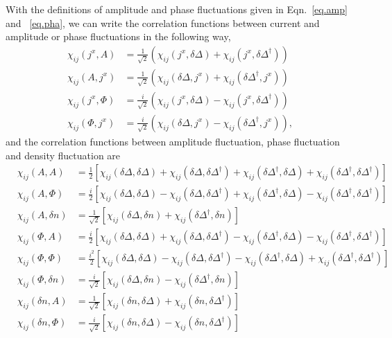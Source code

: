 \documentclass[Colective.tex]{revtex4-1}
\begin{document}
With the definitions of amplitude and phase fluctuations given in Eqn.~\eqref{eq.amp} and ~\eqref{eq.pha}, we can write the correlation functions between current and amplitude or phase fluctuations in the following way,
\begin{eqnarray}
\chi_{ij}(j^x,A) &=\frac{1}{\sqrt{2}} \left( \chi_{ij}(j^x,\delta\Delta) + \chi_{ij}(j^x,\delta\Delta^\dagger) \right)\\
\chi_{ij}(A,j^x) &=\frac{1}{\sqrt{2}} \left( \chi_{ij}(\delta\Delta,j^x) + \chi_{ij}(\delta\Delta^\dagger,j^x) \right)\\
\chi_{ij}(j^x,\Phi) &=\frac{i}{\sqrt{2}} \left( \chi_{ij}(j^x,\delta\Delta) - \chi_{ij}(j^x,\delta\Delta^\dagger) \right)\\
\chi_{ij}(\Phi,j^x) &=\frac{i}{\sqrt{2}} \left( \chi_{ij}(\delta\Delta,j^x) - \chi_{ij}(\delta\Delta^\dagger,j^x) \right),
\label{eq.4}
\end{eqnarray} 
and the correlation functions between amplitude fluctuation, phase fluctuation and density fluctuation are 
\begin{eqnarray}
&\chi_{ij}(A,A)&= \frac{1}{2} \left[ \chi_{ij}(\delta \Delta,\delta \Delta) + \chi_{ij}(\delta \Delta,\delta \Delta^\dagger) + \chi_{ij}(\delta \Delta^\dagger,\delta \Delta) + \chi_{ij}(\delta \Delta^\dagger,\delta \Delta^\dagger) \right]\\
&\chi_{ij}(A,\Phi)&= \frac{i}{2} \left[ \chi_{ij}(\delta \Delta,\delta \Delta) - \chi_{ij}(\delta \Delta,\delta \Delta^\dagger) + \chi_{ij}(\delta \Delta^\dagger,\delta \Delta) - \chi_{ij}(\delta \Delta^\dagger,\delta \Delta^\dagger) \right]\\
&\chi_{ij}(A,\delta n)&= \frac{1}{\sqrt{2}} \left[ \chi_{ij}(\delta \Delta,\delta n) + \chi_{ij}(\delta \Delta^\dagger,\delta n) \right]\\
&\chi_{ij}(\Phi,A)&= \frac{i}{2} \left[ \chi_{ij}(\delta \Delta,\delta \Delta) + \chi_{ij}(\delta \Delta,\delta \Delta^\dagger) - \chi_{ij}(\delta \Delta^\dagger,\delta \Delta) - \chi_{ij}(\delta \Delta^\dagger,\delta \Delta^\dagger) \right]\\
&\chi_{ij}(\Phi,\Phi)&=\frac{i^2}{2} \left[ \chi_{ij}(\delta \Delta,\delta \Delta) - \chi_{ij}(\delta \Delta,\delta \Delta^\dagger) - \chi_{ij}(\delta \Delta^\dagger,\delta \Delta) + \chi_{ij}(\delta \Delta^\dagger,\delta \Delta^\dagger) \right]\\
&\chi_{ij}(\Phi,\delta n)&= \frac{i}{\sqrt{2}} \left[ \chi_{ij}(\delta \Delta,\delta n) - \chi_{ij}(\delta \Delta^\dagger,\delta n) \right]\\
&\chi_{ij}(\delta n,A)&= \frac{1}{\sqrt{2}} \left[ \chi_{ij}(\delta n,\delta \Delta) + \chi_{ij}(\delta n,\delta \Delta^\dagger) \right]\\
&\chi_{ij}(\delta n,\Phi)&= \frac{i}{\sqrt{2}} \left[ \chi_{ij}(\delta n,\delta \Delta) - \chi_{ij}(\delta n,\delta \Delta^\dagger) \right]
\label{eq.5}
\end{eqnarray} 
\end{document}
